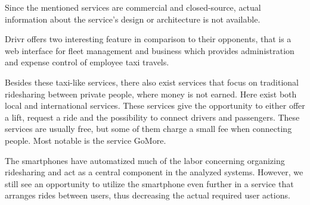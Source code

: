 Since the mentioned services are commercial and closed-source, actual information about the service's design or architecture is not available.

Drivr offers two interesting feature in comparison to their opponents, that is a web interface for fleet management and business which provides administration and expense control of employee taxi travels.

Besides these taxi-like services, there also exist services that focus on traditional ridesharing between private people, where money is not earned.
Here exist both local and international services. 
These services give the opportunity to either offer a lift, request a ride and the possibility to connect drivers and passengers.
These services are usually free, but some of them charge a small fee when connecting people.
Most notable is the service GoMore.

The smartphones have automatized much of the labor concerning organizing ridesharing and act as a central component in the analyzed systems.
However, we still see an opportunity to utilize the smartphone even further in a service that arranges rides between users, thus decreasing the actual required user actions.
